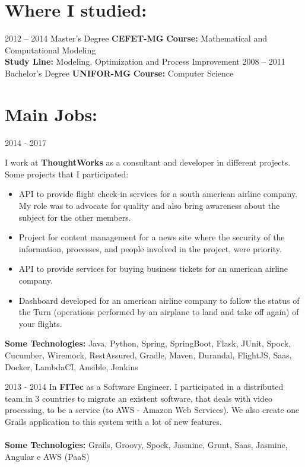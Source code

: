 \documentclass[]{friggeri-cv}
\begin{document}
\section{Where I studied:}

\begin{entrylist}
   \entry
    {2012 – 2014}
    {Master's Degree}
    {\textbf{CEFET-MG}}
    {\textbf{Course:} Mathematical and Computational Modeling\\ \textbf{Study Line:} Modeling, Optimization and Process Improvement}
  \entry
    {2008 – 2011}
    {Bachelor's Degree}
    {\textbf{UNIFOR-MG}}
    {\textbf{Course:} Computer Science}  
\end{entrylist}

\section{Main Jobs:}
\begin{entrylist}
  \entry
    {2014 - 2017}
    {{\normalfont I work at \textbf{ThoughtWorks} as a consultant and developer in different projects. Some projects that I participated:\\
    \begin{itemize} 
        \item API to provide flight check-in services for a south american airline company. My role was to advocate for quality and also bring awareness about the subject for the other members.\\
        \item Project for content management for a news site where the security of the information, processes, and people involved in the project, were priority.\\
        \item API to provide services for buying business tickets for an american airline company.\\
        \item Dashboard developed for an american airline company to follow the status of the Turn (operations performed by an airplane to land and take off again) of your flights.\\
\end{itemize}
\textbf{Some Technologies:} Java, Python, Spring, SpringBoot, Flask, JUnit, Spock, Cucumber, Wiremock, RestAssured, Gradle, Maven, Durandal, FlightJS, Saas, Docker, LambdaCI, Ansible, Jenkins
    }}{}{}
\end{entrylist}

\newpage
\begin{entrylist}  
  \entry
    {2013 - 2014}
    {{\normalfont In \textbf{FITec} as a Software Engineer. I participated in a distributed team in 3 countries to migrate an existent software, that deals with video processing, to be a service (to AWS - Amazon Web Services). We also create one Grails application to this system with a lot of new features.\\
        \\\textbf{Some Technologies:} Grails, Groovy, Spock, Jasmine, Grunt, Saas, Jasmine, Angular e AWS (PaaS)
    }}{}{}
\end{entrylist}
\end{document}
